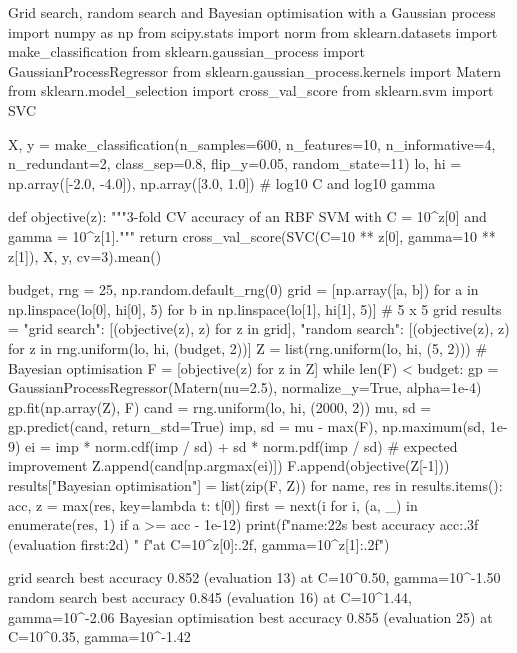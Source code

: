 \begin{pylisting}[label={lst:hpo}]{Grid search, random search and Bayesian optimisation with a Gaussian process}
import numpy as np
from scipy.stats import norm
from sklearn.datasets import make_classification
from sklearn.gaussian_process import GaussianProcessRegressor
from sklearn.gaussian_process.kernels import Matern
from sklearn.model_selection import cross_val_score
from sklearn.svm import SVC

X, y = make_classification(n_samples=600, n_features=10, n_informative=4, n_redundant=2,
                           class_sep=0.8, flip_y=0.05, random_state=11)
lo, hi = np.array([-2.0, -4.0]), np.array([3.0, 1.0])      # log10 C and log10 gamma

def objective(z):
    """3-fold CV accuracy of an RBF SVM with C = 10^z[0] and gamma = 10^z[1]."""
    return cross_val_score(SVC(C=10 ** z[0], gamma=10 ** z[1]), X, y, cv=3).mean()

budget, rng = 25, np.random.default_rng(0)
grid = [np.array([a, b]) for a in np.linspace(lo[0], hi[0], 5)
        for b in np.linspace(lo[1], hi[1], 5)]                     # 5 x 5 grid
results = {"grid search": [(objective(z), z) for z in grid],
           "random search": [(objective(z), z) for z in rng.uniform(lo, hi, (budget, 2))]}
Z = list(rng.uniform(lo, hi, (5, 2)))                              # Bayesian optimisation
F = [objective(z) for z in Z]
while len(F) < budget:
    gp = GaussianProcessRegressor(Matern(nu=2.5), normalize_y=True, alpha=1e-4)
    gp.fit(np.array(Z), F)
    cand = rng.uniform(lo, hi, (2000, 2))
    mu, sd = gp.predict(cand, return_std=True)
    imp, sd = mu - max(F), np.maximum(sd, 1e-9)
    ei = imp * norm.cdf(imp / sd) + sd * norm.pdf(imp / sd)         # expected improvement
    Z.append(cand[np.argmax(ei)])
    F.append(objective(Z[-1]))
results["Bayesian optimisation"] = list(zip(F, Z))
for name, res in results.items():
    acc, z = max(res, key=lambda t: t[0])
    first = next(i for i, (a, _) in enumerate(res, 1) if a >= acc - 1e-12)
    print(f"{name:22s} best accuracy {acc:.3f} (evaluation {first:2d}) "
          f"at C=10^{z[0]:.2f}, gamma=10^{z[1]:.2f}")
\end{pylisting}
\begin{pyoutput}
grid search            best accuracy 0.852 (evaluation 13) at C=10^0.50, gamma=10^-1.50
random search          best accuracy 0.845 (evaluation 16) at C=10^1.44, gamma=10^-2.06
Bayesian optimisation  best accuracy 0.855 (evaluation 25) at C=10^0.35, gamma=10^-1.42
\end{pyoutput}

